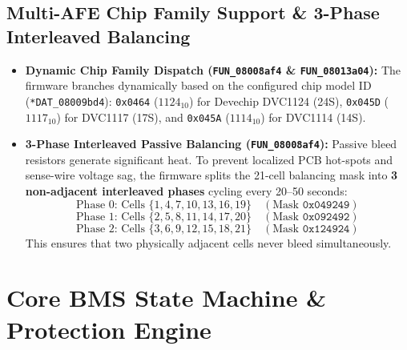 \documentclass[10pt,a4paper]{article}
\begin{document}
\subsection{Multi-AFE Chip Family Support \& 3-Phase Interleaved Balancing}
\begin{itemize}
    \item \textbf{Dynamic Chip Family Dispatch (\texttt{FUN\_08008af4} \& \texttt{FUN\_08013a04}):}
    The firmware branches dynamically based on the configured chip model ID (\texttt{*DAT\_08009bd4}):
    \texttt{0x0464} ($1124_{10}$) for Devechip DVC1124 (24S), \texttt{0x045D} ($1117_{10}$) for DVC1117 (17S), and \texttt{0x045A} ($1114_{10}$) for DVC1114 (14S).
    \item \textbf{3-Phase Interleaved Passive Balancing (\texttt{FUN\_08008af4}):}
    Passive bleed resistors generate significant heat. To prevent localized PCB hot-spots and sense-wire voltage sag, the firmware splits the 21-cell balancing mask into \textbf{3 non-adjacent interleaved phases} cycling every 20--50 seconds:
    \begin{equation}
        \text{Phase 0: Cells } \{1, 4, 7, 10, 13, 16, 19\} \quad (\text{Mask } \texttt{0x049249})
    \end{equation}
    \begin{equation}
        \text{Phase 1: Cells } \{2, 5, 8, 11, 14, 17, 20\} \quad (\text{Mask } \texttt{0x092492})
    \end{equation}
    \begin{equation}
        \text{Phase 2: Cells } \{3, 6, 9, 12, 15, 18, 21\} \quad (\text{Mask } \texttt{0x124924})
    \end{equation}
    This ensures that two physically adjacent cells never bleed simultaneously.
\end{itemize}

\section{Core BMS State Machine \& Protection Engine}
\end{document}
